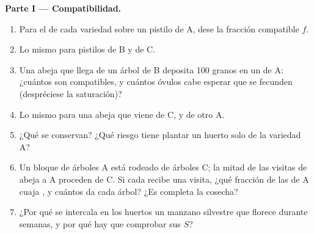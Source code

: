 \begin{problem}
\medskip
\noindent\textbf{Parte I --- Compatibilidad.}
\begin{enumerate}
  \item Para el  de cada variedad sobre un pistilo de A, dese la
        fracción compatible $f$.
  \item Lo mismo para pistilos de B y de C.
  \item Una abeja que llega de un árbol de B deposita 100 granos en un
         de A: ¿cuántos son compatibles, y cuántos óvulos cabe
        esperar que se fecunden (despréciese la saturación)?
  \item Lo mismo para una abeja que viene de C, y de otro A.
  \item ¿Qué  se conservan? ¿Qué riesgo tiene plantar un huerto
        solo de la variedad A?
  \item Un bloque de árboles A está rodeado de árboles C; la mitad de las
        visitas de abeja a A proceden de C. Si cada  recibe una
        visita, ¿qué fracción de las  de A cuaja , y cuántos
         da cada árbol? ¿Es completa la cosecha?
  \item ¿Por qué se intercala en los huertos un manzano silvestre que
        florece durante semanas, y por qué hay que comprobar sus 
        $S$?
\end{enumerate}


\end{problem}
